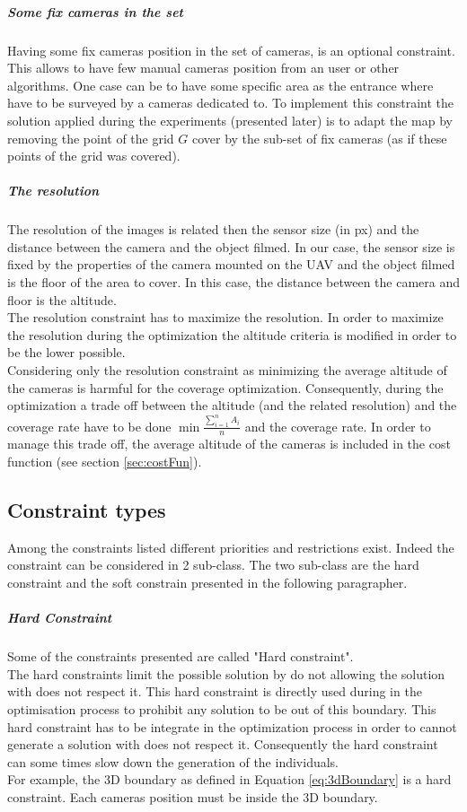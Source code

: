 \subparagraph{Some fix cameras in the set}
Having some fix cameras position in the set of cameras, is an optional constraint. This allows to have few manual cameras position from an user or other algorithms.
One case can be to have some specific area as the entrance where have to be surveyed by a cameras dedicated to.  
To implement this constraint the solution applied during the experiments (presented later) is to adapt the map by removing the point of the grid $G$ cover by the sub-set of fix cameras (as if these points of the grid was covered).

\subparagraph{The resolution}
The resolution of the images is related then the sensor size (in px) and the distance between the camera and the object filmed. In our case, the sensor size is fixed by the properties of the camera mounted on the UAV and the object filmed is the floor of the area to cover. In this case, the distance between the camera and floor is the altitude. \\
The resolution constraint has to maximize the resolution. In order to maximize the resolution during the optimization the altitude criteria is modified in order to be the lower possible.\\
Considering only the resolution constraint as minimizing the average altitude of the cameras is harmful for the coverage optimization.
Consequently, during the optimization a trade off between the altitude (and the related resolution) and the coverage rate have to be done $\min{\frac{\sum^n_{i=1}{A_i}}{n}}$ and the coverage rate. In order to manage this trade off, the average altitude of the cameras is included in the cost function (see section  \ref{sec:costFun}).  \\
 
\subsection{Constraint types}
 
Among the constraints listed different priorities and restrictions exist. Indeed the constraint can be considered in 2 sub-class. The two sub-class are the hard constraint and the soft constrain  presented in the following paragrapher.

\subparagraph{Hard Constraint}
 Some of the constraints presented are called "Hard constraint". \\
 The hard constraints limit the possible solution by do not allowing the solution with does not respect it. This hard constraint is directly used during in the optimisation process to prohibit any solution to be out of this boundary. This hard constraint has to be integrate in the optimization process in order to cannot generate a solution with does not respect it. Consequently the hard constraint can some times slow down the generation of the individuals.\\ 
 For example, the 3D boundary as defined in Equation \ref{eq:3dBoundary} is a hard constraint. Each cameras position must be inside the 3D boundary.\\
 
